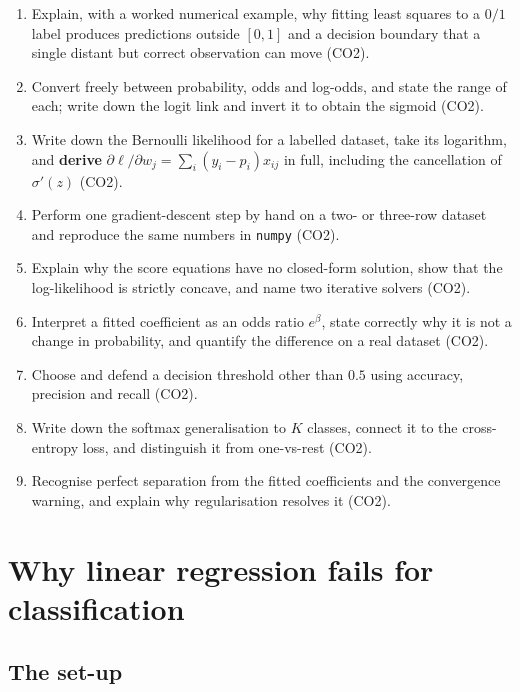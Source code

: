 \documentclass[11pt]{article}
\begin{document}
\begin{enumerate}[leftmargin=*]
  \item Explain, with a worked numerical example, why fitting least squares to
    a $0/1$ label produces predictions outside $[0,1]$ and a decision
    boundary that a single distant but correct observation can move (CO2).
  \item Convert freely between probability, odds and log-odds, and state the
    range of each; write down the logit link and invert it to obtain the
    sigmoid (CO2).
  \item Write down the Bernoulli likelihood for a labelled dataset, take its
    logarithm, and \textbf{derive} $\partial\ell/\partial w_j
    = \sum_i (y_i - p_i)x_{ij}$ in full, including the cancellation of
    $\sigma'(z)$ (CO2).
  \item Perform one gradient-descent step by hand on a two- or three-row
    dataset and reproduce the same numbers in \texttt{numpy} (CO2).
  \item Explain why the score equations have no closed-form solution, show
    that the log-likelihood is strictly concave, and name two iterative
    solvers (CO2).
  \item Interpret a fitted coefficient as an odds ratio $e^{\beta}$, state
    correctly why it is not a change in probability, and quantify the
    difference on a real dataset (CO2).
  \item Choose and defend a decision threshold other than $0.5$ using
    accuracy, precision and recall (CO2).
  \item Write down the softmax generalisation to $K$ classes, connect it to
    the cross-entropy loss, and distinguish it from one-vs-rest (CO2).
  \item Recognise perfect separation from the fitted coefficients and the
    convergence warning, and explain why regularisation resolves it (CO2).
\end{enumerate}

\section{Why linear regression fails for classification}
\label{sec:why}

\subsection{The set-up}
\end{document}
